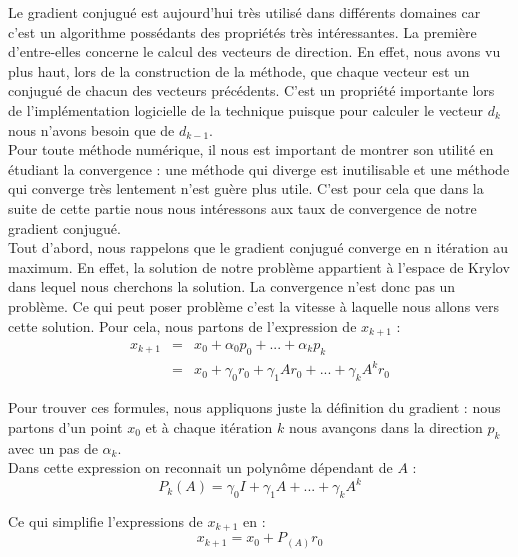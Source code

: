 Le gradient conjugué est aujourd'hui très utilisé dans différents domaines car c'est un algorithme possédants des propriétés très intéressantes. La première d'entre-elles concerne le calcul des vecteurs de direction. En effet, nous avons vu plus haut, lors de la construction de la méthode, que chaque vecteur est un conjugué de chacun des vecteurs précédents. C'est un propriété importante lors de l'implémentation logicielle de la technique puisque pour calculer le vecteur $d_k$ nous n'avons besoin que de $d_{k-1}$. \\

Pour toute méthode numérique, il nous est important de montrer son utilité en étudiant la convergence : une méthode qui diverge est inutilisable et une méthode qui converge très lentement n'est guère plus utile. C'est pour cela que dans la suite de cette partie nous nous intéressons aux taux de convergence de notre gradient conjugué.\\

Tout d'abord, nous rappelons que le gradient conjugué converge en n itération au maximum. En effet, la solution de notre problème appartient à l'espace de Krylov dans lequel nous cherchons la solution. La convergence n'est donc pas un problème. Ce qui peut poser problème c'est la vitesse à laquelle nous allons vers cette solution. Pour cela, nous partons de l'expression de $x_{k+1}$ : 
\begin{eqnarray}
	x_{k+1} &=& x_0 + \alpha_0p_0 + ... + \alpha_kp_k\\
	&=& x_0 + \gamma_0r_0 + \gamma_1Ar_0 + ... + \gamma_kA^kr_0
\end{eqnarray}

Pour trouver ces formules, nous appliquons juste la définition du gradient : nous partons d'un point $x_0$ et à chaque itération $k$ nous avançons dans la direction $p_k$ avec un pas de $\alpha_k$. \\

Dans cette expression on reconnait un polynôme dépendant de $A$ : 
\begin{equation}
P_k(A) = \gamma_0 I + \gamma_1A + ... + \gamma_kA^k
\end{equation}

Ce qui simplifie l'expressions de $x_{k+1}$ en : 
\begin{equation}
x_{k+1} = x_0 + P_(A)r_0
\end{equation}

